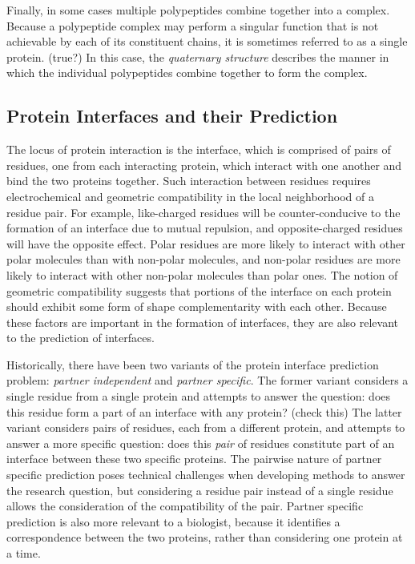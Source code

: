Finally, in some cases multiple polypeptides combine together into a complex.
Because a polypeptide complex may perform a singular function that is not achievable by each of its constituent chains, it is sometimes referred to as a single protein.  (true?)
In this case, the \textit{quaternary structure} describes the manner in which the individual polypeptides combine together to form the complex. 



\subsection{Protein Interfaces and their Prediction}

The locus of protein interaction is the interface, which is comprised of pairs of residues, one from each interacting protein, which interact with one another and bind the two proteins together.
Such interaction between residues requires electrochemical and geometric compatibility in the local neighborhood of a residue pair.
For example, like-charged residues will be counter-conducive to the formation of an interface due to mutual repulsion, and opposite-charged residues will have the opposite effect.
Polar residues are more likely to interact with other polar molecules than with non-polar molecules, and non-polar residues are more likely to interact with other non-polar molecules than polar ones.
The notion of geometric compatibility suggests that portions of the interface on each protein should exhibit some form of shape complementarity with each other. 
Because these factors are important in the formation of interfaces, they are also relevant to the prediction of interfaces.

Historically, there have been two variants of the protein interface prediction problem: \textit{partner independent} and \textit{partner specific}.
The former variant considers a single residue from a single protein and attempts to answer the question: does this residue form a part of an interface with any protein? (check this)
The latter variant considers pairs of residues, each from a different protein, and attempts to answer a more specific question: does this \textit{pair} of residues constitute part of an interface between these two specific proteins. 
The pairwise nature of partner specific prediction poses technical challenges when developing methods to answer the research question, but considering a residue pair instead of a single residue allows the consideration of the compatibility of the pair.
Partner specific prediction is also more relevant to a biologist, because it identifies a correspondence between the two proteins, rather than considering one protein at a time.

